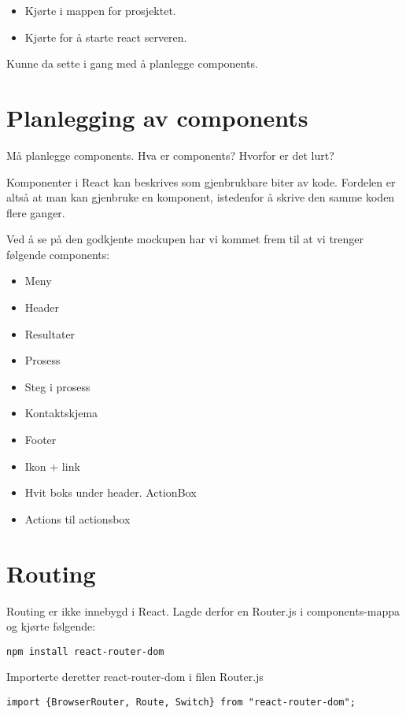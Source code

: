 \begin{itemize}
\item Kjørte  i mappen for prosjektet.
\item Kjørte  for å starte react serveren.
\end{itemize}

Kunne da sette i gang med å planlegge components.

\section{Planlegging av components}
Må planlegge components. Hva er components? Hvorfor er det lurt?

Komponenter i React kan beskrives som gjenbrukbare biter av kode. Fordelen er altså at man kan gjenbruke en komponent, istedenfor å skrive den samme koden flere ganger. 

Ved å se på den godkjente mockupen har vi kommet frem til at vi trenger følgende components: 
\begin{itemize}
\item Meny
\item Header
\item Resultater
\item Prosess
\item Steg i prosess
\item Kontaktskjema
\item Footer
\item Ikon + link
\item Hvit boks under header. ActionBox
\item Actions til actionsbox
\end{itemize}


\section{Routing}
Routing er ikke innebygd i React. Lagde derfor en Router.js i components-mappa og kjørte følgende:

\begin{lstlisting}
npm install react-router-dom
\end{lstlisting}

Importerte deretter react-router-dom i filen Router.js

\begin{lstlisting}
import {BrowserRouter, Route, Switch} from "react-router-dom";
\end{lstlisting}

